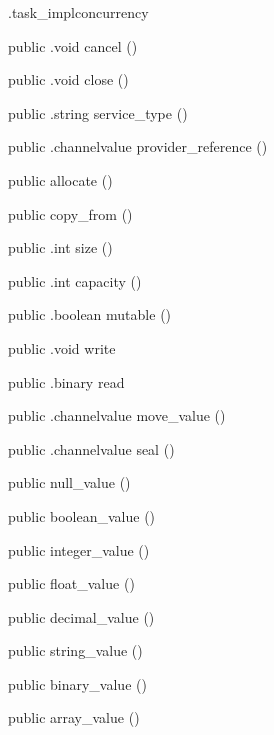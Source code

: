 \begin{CrexxClass}{.task\_impl}{concurrency}
\begin{Members}
    \Method
      {public}
      {.void}
      {cancel}
      {()}

    \Method
      {public}
      {.void}
      {close}
      {()}

    \Method
      {public}
      {.string}
      {service\_type}
      {()}

    \Method
      {public}
      {.channelvalue}
      {provider\_reference}
      {()}

    \Factory
      {public}
      {allocate}
      {()}

    \Factory
      {public}
      {copy\_from}
      {()}

    \Method
      {public}
      {.int}
      {size}
      {()}

    \Method
      {public}
      {.int}
      {capacity}
      {()}

    \Method
      {public}
      {.boolean}
      {mutable}
      {()}

    \Method
      {public}
      {.void}
      {write}
      {}

    \Method
      {public}
      {.binary}
      {read}
      {}

    \Method
      {public}
      {.channelvalue}
      {move\_value}
      {()}

    \Method
      {public}
      {.channelvalue}
      {seal}
      {()}

    \Factory
      {public}
      {null\_value}
      {()}

    \Factory
      {public}
      {boolean\_value}
      {()}

    \Factory
      {public}
      {integer\_value}
      {()}

    \Factory
      {public}
      {float\_value}
      {()}

    \Factory
      {public}
      {decimal\_value}
      {()}

    \Factory
      {public}
      {string\_value}
      {()}

    \Factory
      {public}
      {binary\_value}
      {()}

    \Factory
      {public}
      {array\_value}
      {()}


\end{Members}
\end{CrexxClass}
